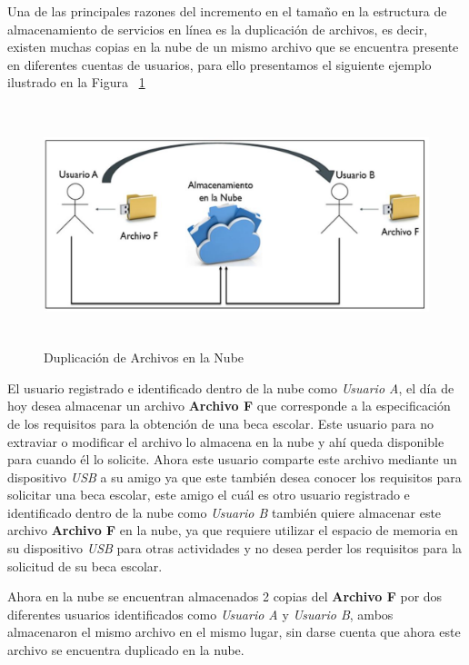 Una de las principales razones del incremento en el tamaño en la estructura de almacenamiento de servicios en línea es la duplicación de archivos, es decir, existen muchas copias en la nube de un mismo archivo que se encuentra presente en diferentes cuentas de usuarios, para ello presentamos el siguiente ejemplo ilustrado en la Figura ~\ref{fig:1-1-2}

\begin{figure}[H]
\centering
\includegraphics[width=15cm, height=7cm]{./images/duplicacion.jpg}
\caption{Duplicación de Archivos en la Nube}
\label{fig:1-1-2}
\end{figure}


El usuario registrado e identificado dentro de la nube como \textit{Usuario A}, el día de hoy desea almacenar un archivo \textbf{Archivo F} que corresponde a la especificación de los requisitos para la obtención de una beca escolar. Este usuario para no extraviar o modificar el archivo lo almacena en la nube y ahí queda disponible para cuando él lo solicite. Ahora este usuario comparte este archivo mediante un dispositivo \textit{USB} a su amigo ya que este también desea conocer los requisitos para solicitar una beca escolar, este amigo el cuál es otro usuario registrado e identificado dentro de la nube como \textit{Usuario B} también quiere almacenar este archivo \textbf{Archivo F} en la nube, ya que requiere utilizar el espacio de memoria en su dispositivo \textit{USB} para otras actividades y no desea perder los requisitos para la solicitud de su beca escolar. 


Ahora en la nube se encuentran almacenados 2 copias del \textbf{Archivo F} por dos diferentes usuarios identificados como \textit{Usuario A} y \textit{Usuario B}, ambos almacenaron el mismo archivo en el mismo lugar, sin darse cuenta que ahora este archivo se encuentra duplicado en la nube. \\

